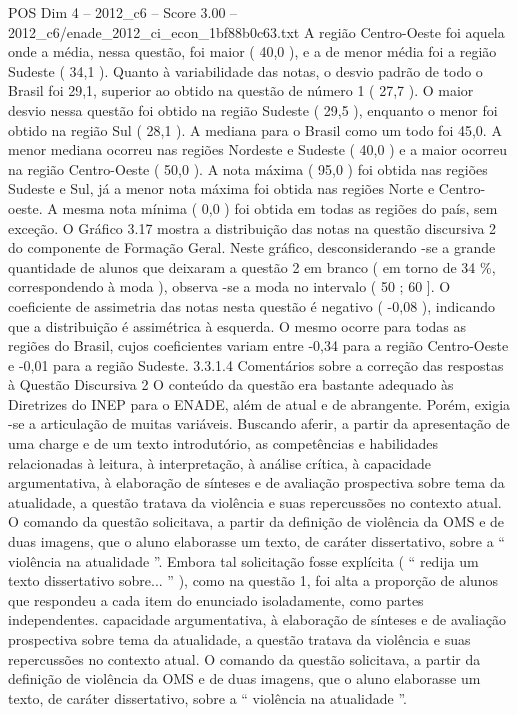 \begin{textsample}{POS Dim 4 – 2012\_c6 – Score 3.00 – 2012\_c6/enade\_2012\_ci\_econ\_1bf88b0c63.txt}
A região Centro-Oeste foi aquela onde a média, nessa questão, foi maior ( 40,0 ), e a de menor média foi a região Sudeste ( 34,1 ).
Quanto à variabilidade das notas, o desvio padrão de todo o Brasil foi 29,1, superior ao obtido na questão de número 1 ( 27,7 ).
O maior desvio nessa questão foi obtido na região Sudeste ( 29,5 ), enquanto o menor foi obtido na região Sul ( 28,1 ).
A mediana para o Brasil como um todo foi 45,0.
A menor mediana ocorreu nas regiões Nordeste e Sudeste ( 40,0 ) e a maior ocorreu na região Centro-Oeste ( 50,0 ).
A nota máxima ( 95,0 ) foi obtida nas regiões Sudeste e Sul, já a menor nota máxima foi obtida nas regiões Norte e Centro-oeste.
A mesma nota mínima ( 0,0 ) foi obtida em todas as regiões do país, sem exceção.
O Gráfico 3.17 mostra a distribuição das notas na questão discursiva 2 do componente de Formação Geral.
Neste gráfico, desconsiderando -se a grande quantidade de alunos que deixaram a questão 2 em branco ( em torno de 34 \%, correspondendo à moda ), observa -se a moda no intervalo ( 50 ; 60 ].
O coeficiente de assimetria das notas nesta questão é negativo ( -0,08 ), indicando que a distribuição é assimétrica à esquerda.
O mesmo ocorre para todas as regiões do Brasil, cujos coeficientes variam entre -0,34 para a região Centro-Oeste e -0,01 para a região Sudeste. 3.3.1.4 Comentários sobre a correção das respostas à Questão Discursiva 2 O conteúdo da questão era bastante adequado às Diretrizes do INEP para o ENADE, além de atual e de abrangente.
Porém, exigia -se a articulação de muitas variáveis.
Buscando aferir, a partir da apresentação de uma charge e de um texto introdutório, as competências e habilidades relacionadas à leitura, à interpretação, à análise crítica, à capacidade argumentativa, à elaboração de sínteses e de avaliação prospectiva sobre tema da atualidade, a questão tratava da violência e suas repercussões no contexto atual.
O comando da questão solicitava, a partir da definição de violência da OMS e de duas imagens, que o aluno elaborasse um texto, de caráter dissertativo, sobre a “ violência na atualidade ”.
Embora tal solicitação fosse explícita ( “ redija um texto dissertativo sobre... ” ), como na questão 1, foi alta a proporção de alunos que respondeu a cada item do enunciado isoladamente, como partes independentes. capacidade argumentativa, à elaboração de sínteses e de avaliação prospectiva sobre tema da atualidade, a questão tratava da violência e suas repercussões no contexto atual.
O comando da questão solicitava, a partir da definição de violência da OMS e de duas imagens, que o aluno elaborasse um texto, de caráter dissertativo, sobre a “ violência na atualidade ”.

\end{textsample}
